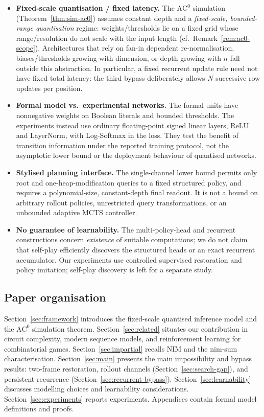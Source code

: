 \documentclass[11pt]{article}
\newcommand{\AC}{\mathrm{AC}}
\theoremstyle{plain}
\theoremstyle{definition}
\theoremstyle{remark}
\numberwithin{equation}{section}
\begin{document}
\begin{itemize}[leftmargin=*]
\item \textbf{Fixed-scale quantisation / fixed latency.}
The $\AC^0$ simulation (Theorem~\ref{thm:sim-ac0}) assumes constant depth and a \emph{fixed-scale, bounded-range quantisation} regime: weights/thresholds lie on a fixed grid whose range/resolution do not scale with the input length (cf.\ Remark~\ref{rem:ac0-scope}).
Architectures that rely on fan-in dependent re-normalisation, biases/thresholds growing with dimension, or depth growing with $n$ fall outside this abstraction.
In particular, a fixed recurrent update rule need not have fixed total latency: the third bypass deliberately allows $N$ successive row updates per position.

\item \textbf{Formal model vs.\ experimental networks.}
The formal units have nonnegative weights on Boolean literals and bounded thresholds. The experiments instead use ordinary floating-point signed linear layers, ReLU and LayerNorm, with Log-Softmax in the loss. They test the benefit of transition information under the reported training protocol, not the asymptotic lower bound or the deployment behaviour of quantised networks.

\item \textbf{Stylised planning interface.}
The single-channel lower bound permits only root and one-heap-modification queries to a fixed structured policy, and requires a polynomial-size, constant-depth final readout. It is not a bound on arbitrary rollout policies, unrestricted query transformations, or an unbounded adaptive MCTS controller.

\item \textbf{No guarantee of learnability.}
The multi-policy-head and recurrent constructions concern \emph{existence} of suitable computations; we do not claim that self-play efficiently discovers the structured heads or an exact recurrent accumulator.
Our experiments use controlled supervised restoration and policy imitation; self-play discovery is left for a separate study.
\end{itemize}

\subsection{Paper organisation}
Section~\ref{sec:framework} introduces the fixed-scale quantised inference model and the $\AC^0$ simulation theorem.
Section~\ref{sec:related} situates our contribution in circuit complexity, modern sequence models, and reinforcement learning for combinatorial games.
Section~\ref{sec:impartial} recalls NIM and the nim-sum characterisation.
Section~\ref{sec:main} presents the main impossibility and bypass results: two-frame restoration, rollout channels (Section~\ref{sec:search-gap}), and persistent recurrence (Section~\ref{sec:recurrent-bypass}).
Section~\ref{sec:learnability} discusses modelling choices and learnability considerations.
Section~\ref{sec:experiments} reports experiments.
Appendices contain formal model definitions and proofs.
\end{document}
